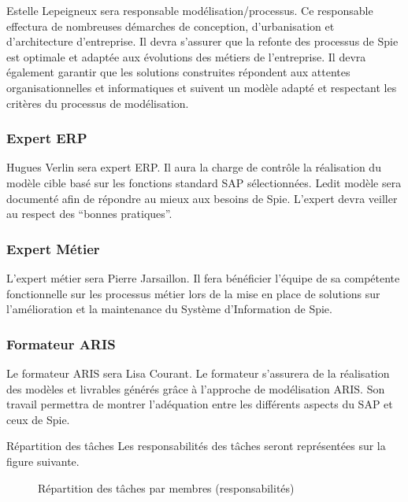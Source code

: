 Estelle Lepeigneux sera responsable modélisation/processus. Ce responsable effectura de nombreuses démarches de conception, d’urbanisation et d’architecture d’entreprise. Il devra s’assurer que la refonte des processus de Spie est optimale et adaptée aux évolutions des métiers de l’entreprise. Il devra également garantir que les solutions construites répondent aux attentes organisationnelles et informatiques et suivent un modèle adapté et respectant les critères du processus de modélisation.

\subsubsection{Expert ERP}

Hugues Verlin sera expert ERP. Il aura la charge de contrôle la réalisation du modèle cible basé sur les fonctions standard SAP sélectionnées. Ledit modèle sera documenté afin de répondre au mieux aux besoins de Spie. L’expert devra veiller au respect des “bonnes pratiques”.

\subsubsection{Expert Métier}

L’expert métier sera Pierre Jarsaillon. Il fera bénéficier l’équipe de sa compétente fonctionnelle sur les processus métier lors de la mise en place de solutions sur l’amélioration et la maintenance du Système d’Information de Spie.

\subsubsection{Formateur ARIS}

Le formateur ARIS sera Lisa Courant. Le formateur s’assurera de la réalisation des modèles et livrables générés grâce à l’approche de modélisation ARIS. Son travail permettra de montrer l'adéquation entre les différents aspects du SAP et ceux de Spie.

Répartition des tâches
    Les responsabilités des tâches seront représentées sur la figure suivante.

\begin{figure}[H]
    \label{fig-risque}
    \noindent{}
    \caption{Répartition des tâches par membres (responsabilités)}
\end{figure}


